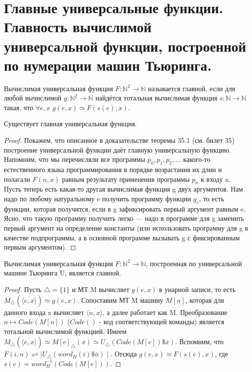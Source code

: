 \section{Главные универсальные функции. Главность вычислимой универсальной функции, построенной по нумерации машин Тьюринга.}

\begin{definition}
Вычислимая универсальная функция $F:\mathbb{N}^2 \rightarrow \mathbb{N}$ называется главной, если для любой вычислимой $g:\mathbb{N}^2 \rightarrow \mathbb{N}$ найдётся тотальная вычислимая функция $s:\mathbb{N} \rightarrow \mathbb{N}$ такая, что $\forall e,x$ $g(e,x) \simeq F(s(e),x)$.
\end{definition}

\begin{theorem}
Существует главная универсальная функция.
\end{theorem}
\begin{proof}
Покажем, что описанное в доказательстве теоремы 35.1 (см. билет 35) построение универсальной функции даёт главную универсальную функцию. Напомним, что мы перечисляли все программы $p_0, p_1, p_2,...$ какого-то естественного языка программирования в порядке возрастания их длин и полагали $F(n,x)$ равным результату применения программы $p_n$ к входу x. Пусть теперь есть какая-то другая вычислимая функция g двух аргументов. Нам надо по любому натуральному e получить программу функции $g_e$, то есть функции, которая получится, если в g зафиксировать первый аргумент равным e. Ясно, что такую программу получить легко — надо в программе для g заменить первый аргумент на определение константы (или использовать программу для g в качестве подпрограммы, а в основной программе вызывать g с фиксированным первым аргументом).
\end{proof}

\begin{theorem}
Вычислимая универсальная функция $F:\mathbb{N}^2 \rightarrow \mathbb{N}$, построенная по универсальной машине Тьюринга U, является главной.
\end{theorem}
\begin{proof}
Пусть $\bigtriangleup = \{1\}$ и МТ M вычисляет $g(e,x)$ в унарной записи, то есть $M_\bigtriangleup (\overline{\langle e,x \rangle}) \simeq \overline{g(e,x)}$. Сопоставим МТ M машину $M[n]$, которая для данного входа x вычисляет $\overline{\langle n,x \rangle}$, а далее работает как M. Преобразование $n \mapsto Code(M[n])$ ($Code()$ - код соответствующей команды) является тотальной вычислимой функцией.
Имеем $M_\bigtriangleup (\overline{\langle e,x \rangle}) \simeq M[e]_\bigtriangleup (\overline{x}) \simeq U_\bigtriangleup (Code(M[e]) \$ \overline{x}) $. Вспомним, что $F(i,n) \rightleftharpoons \mid U_\bigtriangleup (word_{\Pi} (i) \$ \overline{n}) \mid $. Отсюда $g(e,x) \simeq F(s(e),x)$, где $s(e) = word_{\Pi}^{-1} (Code(M[e])) $.

\end{proof}